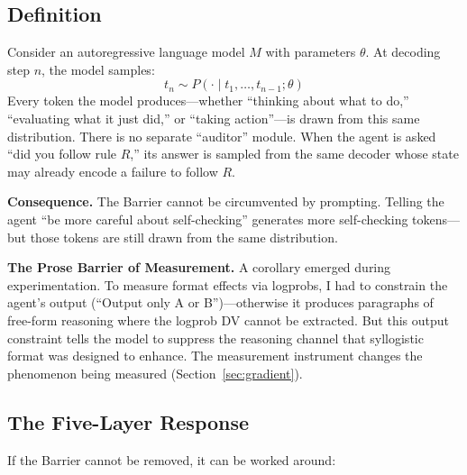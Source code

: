\documentclass[11pt]{article}
\begin{document}
\subsection{Definition}

Consider an autoregressive language model $M$ with parameters $\theta$. At
decoding step $n$, the model samples:
\[
t_n \sim P(\cdot \mid t_{1}, \ldots, t_{n-1}; \theta)
\]
Every token the model produces---whether ``thinking about what to do,''
``evaluating what it just did,'' or ``taking action''---is drawn from this same
distribution. There is no separate ``auditor'' module. When the agent is asked
``did you follow rule $R$,'' its answer is sampled from the same decoder whose
state may already encode a failure to follow $R$.

\textbf{Consequence.} The Barrier cannot be circumvented by prompting. Telling
the agent ``be more careful about self-checking'' generates more self-checking
tokens---but those tokens are still drawn from the same distribution.

\textbf{The Prose Barrier of Measurement.} A corollary emerged during
experimentation. To measure format effects via logprobs, I had to constrain the
agent's output (``Output only A or B'')---otherwise it produces paragraphs of
free-form reasoning where the logprob DV cannot be extracted. But this output
constraint tells the model to suppress the reasoning channel that syllogistic
format was designed to enhance. The measurement instrument changes the
phenomenon being measured (Section~\ref{sec:gradient}).

\subsection{The Five-Layer Response}

If the Barrier cannot be removed, it can be worked around:
\end{document}
